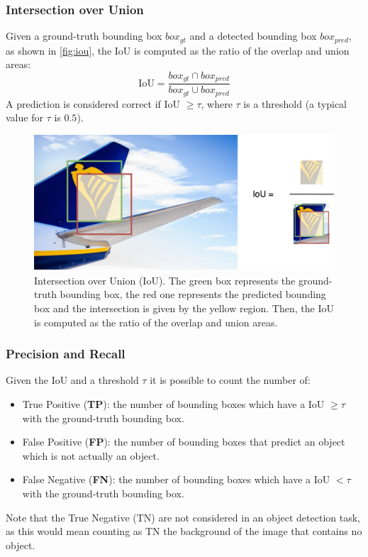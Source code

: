 \subsubsection{Intersection over Union}
Given a ground-truth bounding box $box_{gt}$ and a detected bounding box $box_{pred}$, as shown in \autoref{fig:iou}, the IoU is computed as the ratio of the overlap and union areas:
\begin{equation}
    \text{IoU} = \frac{box_{gt} \cap box_{pred}}{box_{gt} \cup box_{pred}} 
\end{equation}
A prediction is considered correct if IoU $ \geq \tau$, where $\tau$ is a threshold (a typical value for $\tau$ is $0.5$).

\begin{figure}[H]
	\centering
    \includegraphics[width=1\textwidth]{images/iou.drawio.png}
	\caption{Intersection over Union (IoU). The green box represents the ground-truth bounding box, the red one represents the predicted bounding box and the intersection is given by the yellow region. Then, the IoU is computed as the ratio of the overlap and union areas.}
	\label{fig:iou}
\end{figure}

\subsubsection{Precision and Recall}
Given the IoU and a threshold $\tau$ it is possible to count the number of:
\begin{itemize}
    \item True Positive (\textbf{TP}): the number of bounding boxes which have a IoU $\geq \tau$ with the ground-truth bounding box.
    \item False Positive (\textbf{FP}): the number of bounding boxes that predict an object which is not actually an object.
    \item False Negative (\textbf{FN}): the number of bounding boxes which have a IoU $< \tau$ with the ground-truth bounding box.
\end{itemize}
Note that the True Negative (TN) are not considered in an object detection task, as this would mean counting as TN the background of the image that contains no object.

